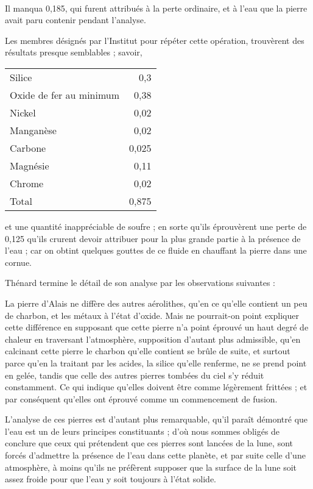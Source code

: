 \documentclass[a4paper, 12pt, oneside, french]{article}
\begin{document}
\paragraph{}
Il manqua 0,185, qui furent attribués à la perte ordinaire, et à l'eau que la pierre avait paru contenir pendant l'analyse.

Les membres désignés par l'Institut pour répéter cette opération, trouvèrent des résultats presque semblables ; savoir,
\begin{table}[H]
    \centering
    \begin{tabular}{l r}
        Silice & 0,3 \\
        Oxide de fer au minimum & 0,38 \\
        Nickel & 0,02 \\
        Manganèse & 0,02 \\
        Carbone & 0,025 \\
        Magnésie & 0,11 \\
        Chrome & 0,02 \\ \hline
        Total & 0,875 \\
    \end{tabular}
\end{table}
et une quantité inappréciable de soufre ; en sorte qu'ils éprouvèrent une perte de 0,125 qu'ils crurent devoir attribuer pour la plus grande partie à la présence de l'eau ; car on obtint quelques gouttes de ce fluide en chauffant la pierre dans une cornue.

Thénard termine le détail de son analyse par les observations suivantes :

\og La pierre d'Alais ne diffère des autres aérolithes, qu'en ce qu'elle contient un peu de charbon, et les métaux à l'état d'oxide. Mais ne pourrait-on point expliquer cette différence en supposant que cette pierre n'a point éprouvé un haut degré de chaleur en traversant l'atmosphère, supposition d'autant plus admissible, qu'en calcinant cette pierre le charbon qu'elle contient se brûle de suite, et surtout parce qu'en la traitant par les acides, la silice qu'elle renferme, ne se prend point en gelée, tandis que celle des autres pierres tombées du ciel s'y réduit constamment. Ce qui indique qu'elles doivent être comme légèrement frittées ; et par conséquent qu'elles ont éprouvé comme un commencement de fusion. \fg

L'analyse de ces pierres est d'autant plus remarquable, qu'il paraît démontré que l'eau est un de leurs principes constituants ; d'où nous sommes obligés de conclure que ceux qui prétendent que ces pierres sont lancées de la lune, sont forcés d'admettre la présence de l'eau dans cette planète, et par suite celle d'une atmosphère, à moins qu'ils ne préfèrent supposer que la surface de la lune soit assez froide pour que l'eau y soit toujours à l'état solide.
\end{document}
